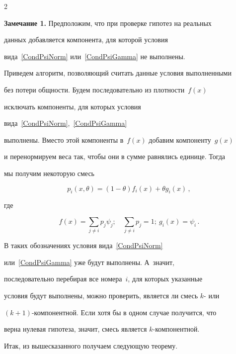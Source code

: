 \begin{multicols}{2}
\medskip



\noindent

\textbf{Замечание 1.} Предположим, что при проверке гипотез на реальных

данных добавляется компонента, для которой условия

вида~\eqref{CondPsiNorm} или~\eqref{CondPsiGamma} не выполнены.

Приведем алгоритм, позволяющий считать данные условия выполненными

без потери общности. Будем последовательно из плотности~$f(x)$

исключать компоненты, для которых условия

вида~\eqref{CondPsiNorm},~\eqref{CondPsiGamma}

выполнены. Вместо этой компоненты в~$f(x)$ добавим компоненту~$g(x)$

и перенормируем веса так, чтобы они в сумме равнялись единице. Тогда

мы получим некоторую смесь

\begin{equation*}

p_i(x,\theta)=(1-\theta) f_i(x)+\theta g_i(x)\,,

\end{equation*}

где

$$

f(x)=\sum\limits_{j\neq i}p_j\psi_j;\quad \sum\limits_{j\neq i}p_j=1;\  g_i(x)=\psi_i\,.

$$

В таких обозначениях условия вида~\eqref{CondPsiNorm}

или~\eqref{CondPsiGamma} уже будут выполнены. А~значит,

последовательно перебирая все номера~$i$, для которых указанные

условия будут выполнены, можно проверить, является ли смесь $k$- или

$(k+1)$-ком\-по\-нент\-ной. Если хотя бы в одном случае получится, что

верна нулевая гипотеза, значит, смесь является $k$-ком\-по\-нентной.



Итак, из вышесказанного получаем следующую теорему.



\medskip



\noindent


\end{multicols}
